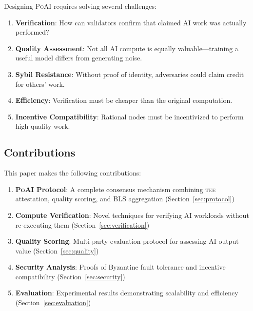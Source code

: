 \documentclass[11pt,letterpaper]{article}
\newcommand{\PoAI}{\textsc{PoAI}}
\newcommand{\TEE}{\textsc{tee}}
\begin{document}
Designing \PoAI{} requires solving several challenges:

\begin{enumerate}
    \item \textbf{Verification}: How can validators confirm that claimed AI work was actually performed?

    \item \textbf{Quality Assessment}: Not all AI compute is equally valuable---training a useful model differs from generating noise.

    \item \textbf{Sybil Resistance}: Without proof of identity, adversaries could claim credit for others' work.

    \item \textbf{Efficiency}: Verification must be cheaper than the original computation.

    \item \textbf{Incentive Compatibility}: Rational nodes must be incentivized to perform high-quality work.
\end{enumerate}

\subsection{Contributions}

This paper makes the following contributions:

\begin{enumerate}
    \item \textbf{\PoAI{} Protocol}: A complete consensus mechanism combining \TEE{} attestation, quality scoring, and BLS aggregation (Section~\ref{sec:protocol})

    \item \textbf{Compute Verification}: Novel techniques for verifying AI workloads without re-executing them (Section~\ref{sec:verification})

    \item \textbf{Quality Scoring}: Multi-party evaluation protocol for assessing AI output value (Section~\ref{sec:quality})

    \item \textbf{Security Analysis}: Proofs of Byzantine fault tolerance and incentive compatibility (Section~\ref{sec:security})

    \item \textbf{Evaluation}: Experimental results demonstrating scalability and efficiency (Section~\ref{sec:evaluation})
\end{enumerate}
\end{document}
